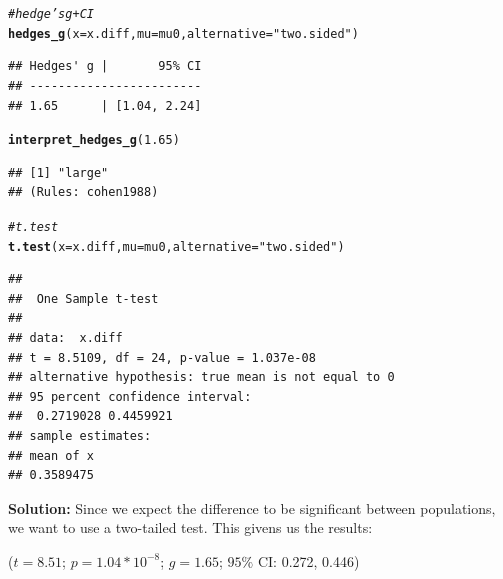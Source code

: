 \documentclass{article}\usepackage[]{graphicx}\usepackage[]{xcolor}
\makeatletter
\newcommand{\hlnum}[1]{\textcolor[rgb]{0.686,0.059,0.569}{#1}}%
\newcommand{\hlsng}[1]{\textcolor[rgb]{0.192,0.494,0.8}{#1}}%
\newcommand{\hlcom}[1]{\textcolor[rgb]{0.678,0.584,0.686}{\textit{#1}}}%
\newcommand{\hldef}[1]{\textcolor[rgb]{0.345,0.345,0.345}{#1}}%
\newcommand{\hlkwc}[1]{\textcolor[rgb]{0.333,0.667,0.333}{#1}}%
\newcommand{\hlkwd}[1]{\textcolor[rgb]{0.737,0.353,0.396}{\textbf{#1}}}%
\newenvironment{kframe}{%
 \def\at@end@of@kframe{}%
 \ifinner\ifhmode%
  \def\at@end@of@kframe{\end{minipage}}%
  \begin{minipage}{\columnwidth}%
 \fi\fi%
 \def\FrameCommand##1{\hskip\@totalleftmargin \hskip-\fboxsep
 \colorbox{shadecolor}{##1}\hskip-\fboxsep
     \hskip-\linewidth \hskip-\@totalleftmargin \hskip\columnwidth}%
 \MakeFramed {\advance\hsize-\width
   \@totalleftmargin\z@ \linewidth\hsize
   \@setminipage}}%
 {\par\unskip\endMakeFramed%
 \at@end@of@kframe}
\newenvironment{knitrout}{}{} %
\makeatother
\begin{document}
\begin{enumerate}
\begin{enumerate}
\begin{knitrout}
\begin{kframe}
\begin{alltt}
\hlcom{# hedge's g + CI}
\hlkwd{hedges_g}\hldef{(}\hlkwc{x} \hldef{= x.diff,} \hlkwc{mu} \hldef{= mu0,} \hlkwc{alternative} \hldef{=} \hlsng{"two.sided"}\hldef{)}
\end{alltt}
\begin{verbatim}
## Hedges' g |       95% CI
## ------------------------
## 1.65      | [1.04, 2.24]
\end{verbatim}
\begin{alltt}
\hlkwd{interpret_hedges_g}\hldef{(}\hlnum{1.65}\hldef{)}
\end{alltt}
\begin{verbatim}
## [1] "large"
## (Rules: cohen1988)
\end{verbatim}
\begin{alltt}
\hlcom{# t.test}
\hlkwd{t.test}\hldef{(}\hlkwc{x}\hldef{=x.diff,} \hlkwc{mu} \hldef{= mu0,} \hlkwc{alternative} \hldef{=} \hlsng{"two.sided"}\hldef{)}
\end{alltt}
\begin{verbatim}
## 
## 	One Sample t-test
## 
## data:  x.diff
## t = 8.5109, df = 24, p-value = 1.037e-08
## alternative hypothesis: true mean is not equal to 0
## 95 percent confidence interval:
##  0.2719028 0.4459921
## sample estimates:
## mean of x 
## 0.3589475
\end{verbatim}
\end{kframe}
\end{knitrout}
\textbf{Solution:} Since we expect the difference to be significant between populations, we want to use a two-tailed test. This givens us the results: 
\begin{center}
($t = 8.51$; $p = 1.04 * 10^{-8}$; $g = 1.65$; $95\%$ CI: 0.272, 0.446)
\end{center}


\end{enumerate}
\end{enumerate}
\end{document}
